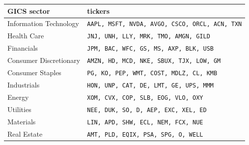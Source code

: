 \begin{tabular}{ll}
GICS sector & tickers \\
\hline
Information Technology & \texttt{AAPL, MSFT, NVDA, AVGO, CSCO, ORCL, ACN, TXN} \\
Health Care & \texttt{JNJ, UNH, LLY, MRK, TMO, AMGN, GILD} \\
Financials & \texttt{JPM, BAC, WFC, GS, MS, AXP, BLK, USB} \\
Consumer Discretionary & \texttt{AMZN, HD, MCD, NKE, SBUX, TJX, LOW, GM} \\
Consumer Staples & \texttt{PG, KO, PEP, WMT, COST, MDLZ, CL, KMB} \\
Industrials & \texttt{HON, UNP, CAT, DE, LMT, GE, UPS, MMM} \\
Energy & \texttt{XOM, CVX, COP, SLB, EOG, VLO, OXY} \\
Utilities & \texttt{NEE, DUK, SO, D, AEP, EXC, XEL, ED} \\
Materials & \texttt{LIN, APD, SHW, ECL, NEM, FCX, NUE} \\
Real Estate & \texttt{AMT, PLD, EQIX, PSA, SPG, O, WELL} \\
\end{tabular}
